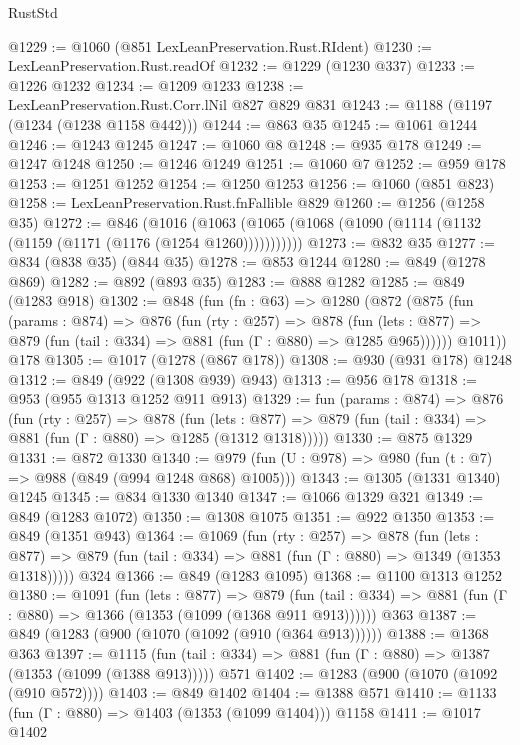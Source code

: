\begin{lexlean}{RustStd}
\begin{coremodule}
@1229 := @1060 (@851 LexLeanPreservation.Rust.RIdent)
@1230 := LexLeanPreservation.Rust.readOf
@1232 := @1229 (@1230 @337)
@1233 := @1226 @1232
@1234 := @1209 @1233
@1238 := LexLeanPreservation.Rust.Corr.lNil @827 @829 @831
@1243 := @1188 (@1197 (@1234 (@1238 @1158 @442)))
@1244 := @863 @35
@1245 := @1061 @1244
@1246 := @1243 @1245
@1247 := @1060 @8
@1248 := @935 @178
@1249 := @1247 @1248
@1250 := @1246 @1249
@1251 := @1060 @7
@1252 := @959 @178
@1253 := @1251 @1252
@1254 := @1250 @1253
@1256 := @1060 (@851 @823)
@1258 := LexLeanPreservation.Rust.fnFallible @829
@1260 := @1256 (@1258 @35)
@1272 := @846
    (@1016 (@1063 (@1065 (@1068 (@1090 (@1114 (@1132 (@1159 (@1171 (@1176 (@1254 @1260)))))))))))
@1273 := @832 @35
@1277 := @834 (@838 @35) (@844 @35)
@1278 := @853 @1244
@1280 := @849 (@1278 @869)
@1282 := @892 (@893 @35)
@1283 := @888 @1282
@1285 := @849 (@1283 @918)
@1302 := @848
    (fun (fn : @63) =>
    @1280
      (@872
        (@875
          (fun (params : @874) =>
          @876
            (fun (rty : @257) =>
            @878
              (fun (lets : @877) =>
              @879 (fun (tail : @334) => @881 (fun (Γ : @880) => @1285 @965))))))
        @1011))
    @178
@1305 := @1017 (@1278 (@867 @178))
@1308 := @930 (@931 @178) @1248
@1312 := @849 (@922 (@1308 @939) @943)
@1313 := @956 @178
@1318 := @953 (@955 @1313 @1252 @911 @913)
@1329 := fun (params : @874) =>
  @876
    (fun (rty : @257) =>
    @878
      (fun (lets : @877) =>
      @879 (fun (tail : @334) => @881 (fun (Γ : @880) => @1285 (@1312 @1318)))))
@1330 := @875 @1329
@1331 := @872 @1330
@1340 := @979 (fun (U : @978) => @980 (fun (t : @7) => @988 (@849 (@994 @1248 @868) @1005)))
@1343 := @1305 (@1331 @1340) @1245
@1345 := @834 @1330 @1340
@1347 := @1066 @1329 @321
@1349 := @849 (@1283 @1072)
@1350 := @1308 @1075
@1351 := @922 @1350
@1353 := @849 (@1351 @943)
@1364 := @1069
    (fun (rty : @257) =>
    @878
      (fun (lets : @877) =>
      @879 (fun (tail : @334) => @881 (fun (Γ : @880) => @1349 (@1353 @1318)))))
    @324
@1366 := @849 (@1283 @1095)
@1368 := @1100 @1313 @1252
@1380 := @1091
    (fun (lets : @877) =>
    @879 (fun (tail : @334) => @881 (fun (Γ : @880) => @1366 (@1353 (@1099 (@1368 @911 @913))))))
    @363
@1387 := @849 (@1283 (@900 (@1070 (@1092 (@910 (@364 @913))))))
@1388 := @1368 @363
@1397 := @1115
    (fun (tail : @334) => @881 (fun (Γ : @880) => @1387 (@1353 (@1099 (@1388 @913)))))
    @571
@1402 := @1283 (@900 (@1070 (@1092 (@910 @572))))
@1403 := @849 @1402
@1404 := @1388 @571
@1410 := @1133 (fun (Γ : @880) => @1403 (@1353 (@1099 @1404))) @1158
@1411 := @1017 @1402

\end{coremodule}
\end{lexlean}
